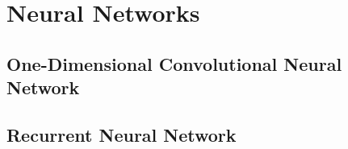 \chapter{Neural Networks}
\label{ch:capitolo4}

\section{One-Dimensional Convolutional Neural Network}

\section{Recurrent Neural Network}